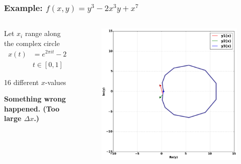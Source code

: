 \documentclass{beamer}
\begin{document}
\begin{frame}
  \frametitle{Example: $f(x,y) = y^3 - 2x^3y + x^7$}
  \begin{columns}
    \begin{column}{0.3\textwidth}
      Let $x_i$ range along the complex circle
      \begin{align*}
          x(t) &= e^{2 \pi i t} - 2 \\
          & t \in [0,1]
      \end{align*}

      {
        \small {\color{red!60!black} 16 different $x$-values}

        \vspace{16pt}

        {\bf Something wrong happened. (Too large $\Delta x$.)} 
      }
    \end{column}

    \begin{column}{0.7\textwidth}
      \begin{figure}
        \centering
        \includegraphics[width=\textwidth]{images/ancontcomplicated16.png}
      \end{figure}
    \end{column}
  \end{columns}
\end{frame}
\end{document}
